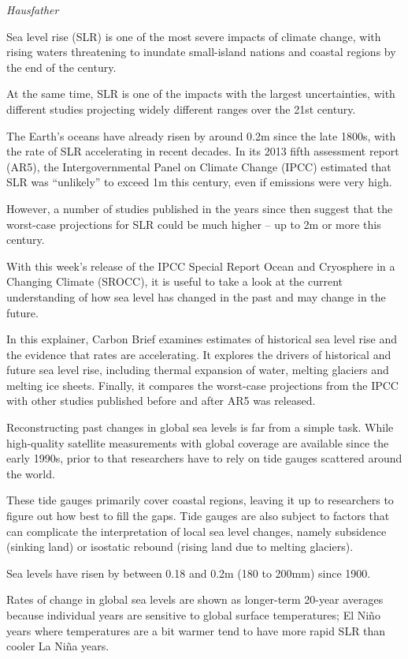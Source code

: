 \documentclass[
]{book}
\begin{document}
\emph{Hausfather}

Sea level rise (SLR) is one of the most severe impacts of climate change, with rising waters threatening to inundate small-island nations and coastal regions by the end of the century.

At the same time, SLR is one of the impacts with the largest uncertainties, with different studies projecting widely different ranges over the 21st century.

The Earth's oceans have already risen by around 0.2m since the late 1800s, with the rate of SLR accelerating in recent decades. In its 2013 fifth assessment report (AR5), the Intergovernmental Panel on Climate Change (IPCC) estimated that SLR was ``unlikely'' to exceed 1m this century, even if emissions were very high.

However, a number of studies published in the years since then suggest that the worst-case projections for SLR could be much higher -- up to 2m or more this century.

With this week's release of the IPCC Special Report Ocean and Cryosphere in a Changing Climate (SROCC), it is useful to take a look at the current understanding of how sea level has changed in the past and may change in the future.

In this explainer, Carbon Brief examines estimates of historical sea level rise and the evidence that rates are accelerating. It explores the drivers of historical and future sea level rise, including thermal expansion of water, melting glaciers and melting ice sheets. Finally, it compares the worst-case projections from the IPCC with other studies published before and after AR5 was released.

Reconstructing past changes in global sea levels is far from a simple task. While high-quality satellite measurements with global coverage are available since the early 1990s, prior to that researchers have to rely on tide gauges scattered around the world.

These tide gauges primarily cover coastal regions, leaving it up to researchers to figure out how best to fill the gaps. Tide gauges are also subject to factors that can complicate the interpretation of local sea level changes, namely subsidence (sinking land) or isostatic rebound (rising land due to melting glaciers).

Sea levels have risen by between 0.18 and 0.2m (180 to 200mm) since 1900.

Rates of change in global sea levels are shown as longer-term 20-year averages because individual years are sensitive to global surface temperatures; El Niño years where temperatures are a bit warmer tend to have more rapid SLR than cooler La Niña years.
\end{document}
